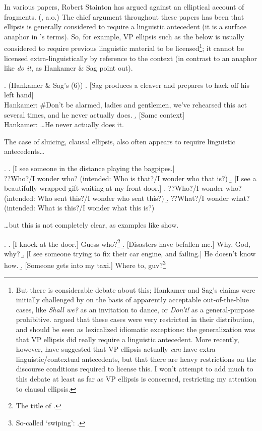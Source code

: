 \documentclass[doublespace]{umthesis}
\begin{document}
In various papers, Robert Stainton has argued against an elliptical account of fragments. (\cite{St98, St05, St06book}, a.o.) The chief argument throughout these papers has been that ellipsis is generally considered to require a linguistic antecedent (it is a surface anaphor in \cite{HS76}'s terms). So, for example, VP ellipsis such as the below is usually considered to require previous linguistic material to be licensed\footnote{But there is considerable debate about this; Hankamer and Sag's claims were initially challenged by \cite{Sc77} on the basis of apparently acceptable out-of-the-blue cases, like {\it Shall we?} as an invitation to dance, or {\it Don't!} as a general-purpose prohibitive. \cite{Pu01} argued that these cases were very restricted in their distribution, and should be seen as lexicalized idiomatic exceptions: the generalization was that VP ellipsis did really require a linguistic antecedent. More recently, however, \cite{MP12} have suggested that VP ellipsis actually \emph{can} have extra-linguistic/contextual antecedents, but that there are heavy restrictions on the discourse conditions required to license this. I won't attempt to add much to this debate at least as far as VP ellipsis is concerned, restricting my attention to clausal ellipsis.}; it cannot be licensed extra-linguistically by reference to the context (in contrast to an anaphor like {\it do it}, as Hankamer \& Sag point out).

\ex. 		(Hankamer \& Sag's (6))
		\a. [Sag produces a cleaver and prepares to hack off his left hand]\\
			Hankamer: \#Don't be alarmed, ladies and gentlemen, we've rehearsed this act several times, and he never actually does.
		\b. [Same context]\\
			Hankamer: \ldots He never actually does it.
			
The case of sluicing, clausal ellipsis, also often appears to require linguistic antecedents\ldots

\ex. 		\a. [I see someone in the distance playing the bagpipes.]\\
			??Who?/I wonder who? (intended: Who is that?/I wonder who that is?)
		\b. [I see a beautifully wrapped gift waiting at my front door.]
			\a. ??Who?/I wonder who?	(intended: Who sent this?/I wonder who sent this?)
			\b. ??What?/I wonder what? (intended: What is this?/I wonder what this is?)
			
\ldots but this is not completely clear, as examples like \Next show.

\ex. 		\a. [I knock at the door.] Guess who?\footnote{The title of \cite{Ro69}.}
		\b. [Disasters have befallen me.] Why, God, why?
		\b. [I see someone trying to fix their car engine, and failing.] He doesn't know how.
		\b. [Someone gets into my taxi.] Where to, guv?\footnote{So-called `swiping': \cite{vC04, HarAi07}.}
		
\end{document}
